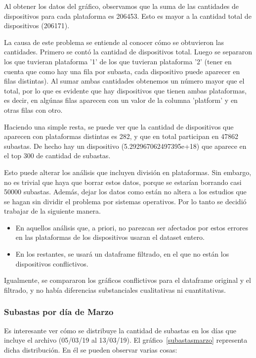 \documentclass[a4paper, 12pt]{article}
\begin{document}
	 Al obtener los datos del gráfico, observamos que la suma de las cantidades de dispositivos para cada plataforma es 206453. Esto es mayor a la cantidad total de dispositivos (206171).
	 
	 
	 La causa de este problema se entiende al conocer cómo se obtuvieron las cantidades. Primero se contó la cantidad de dispositivos total. Luego se separaron los que tuvieran plataforma '1' de los que tuvieran plataforma '2' (tener en cuenta que como hay una fila por subasta, cada dispositivo puede aparecer en filas distintas). Al sumar ambas cantidades obtenemos un número mayor que el total, por lo que es evidente que hay dispositivos que tienen ambas plataformas, es decir, en algúnas filas aparecen con un valor de la columna 'platform' y en otras filas con otro.

	 Haciendo una simple resta, se puede ver que la cantidad de dispositivos que aparecen con plataformas distintas es 282, y que en total participan en 47862 subastas. De hecho hay un dispositivo (5.292967062497395e+18) que aparece en el top 300 de cantidad de subastas.

	 Esto puede alterar los análisis que incluyen división en plataformas. Sin embargo, no es trivial que haya que borrar estos datos, porque se estarían borrando casi 50000 subastas. Además, dejar los datos como están no altera a los estudios que se hagan sin dividir el problema por sistemas operativos. Por lo tanto se decidió trabajar de la siguiente manera.
	 
	\begin{itemize}
		\item En aquellos análisis que, a priori, no parezcan ser afectados por estos errores en las plataformas de los dispositivos usaran el dataset entero.
		\item En los restantes, se usará un dataframe filtrado, en el que no están los dispositivos conflictivos.
	\end{itemize}
	
	 Igualmente, se compararon los gráficos conflictivos para el dataframe original y el filtrado, y no había diferencias substanciales cualitativas ni cuantitativas.
	
	
	\subsubsection{Subastas por día de Marzo}
	 Es interesante ver cómo se distribuye la cantidad de subastas en los días que incluye el archivo (05/03/19 al 13/03/19).
	 El gráfico~\ref{subastasmarzo} representa dicha distribución. En él se pueden observar varias cosas:
\end{document}
